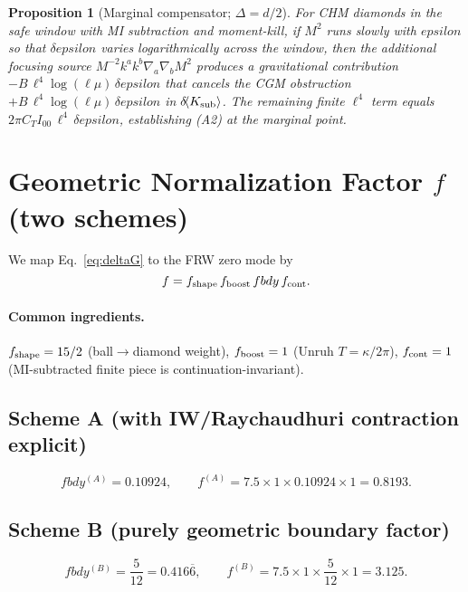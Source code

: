 \documentclass[aps,prd,onecolumn,superscriptaddress,nofootinbib]{revtex4-2}
\def\fbdy{fbdy}%
\def\eps{epsilon}%
\newcommand{\fbdy}{f_{\rm bdy}}
\newcommand{\eps}{\varepsilon}
\newtheorem{proposition}{Proposition}
\begin{document}
\begin{proposition}[Marginal compensator; \(\Delta=d/2\)]
\label{prop:marginal}
For CHM diamonds in the safe window with MI subtraction and moment-kill, if \(M^2\) runs slowly with \(\eps\) so that \(\delta\eps\) varies logarithmically across the window, then the additional focusing source \(M^{-2}k^a k^b\nabla_a\nabla_b M^2\) produces a gravitational contribution \(-B\,\ell^4\log(\ell\mu)\,\delta\eps\) that cancels the CGM obstruction \(+B\,\ell^4\log(\ell\mu)\,\delta\eps\) in \(\delta\!\langle K_{\rm sub}\rangle\). The remaining finite \(\ell^4\) term equals \(2\pi C_T I_{00}\,\ell^4\,\delta\eps\), establishing (A2) at the marginal point.
\end{proposition}


\section{Geometric Normalization Factor \texorpdfstring{$f$}{f} (two schemes)}
\label{sec:f-norm}
We map Eq.~\eqref{eq:deltaG} to the FRW zero mode by
\begin{equation}
f = f_{\rm shape}\, f_{\rm boost}\, \fbdy\, f_{\rm cont}.
\end{equation}

\paragraph*{Common ingredients.}
$f_{\rm shape}=15/2$ (ball$\to$diamond weight), $f_{\rm boost}=1$ (Unruh $T=\kappa/2\pi$), $f_{\rm cont}=1$ (MI-subtracted finite piece is continuation-invariant).

\subsection{Scheme A (with IW/Raychaudhuri contraction explicit)}
\[
\fbdy^{(A)}=0.10924,\qquad
f^{(A)}=7.5\times 1 \times 0.10924 \times 1=0.8193.
\]

\subsection{Scheme B (purely geometric boundary factor)}
\[
\fbdy^{(B)}=\frac{5}{12}=0.416\overline{6},\qquad
f^{(B)}=7.5\times 1 \times \frac{5}{12}\times 1=3.125.
\]
\end{document}
